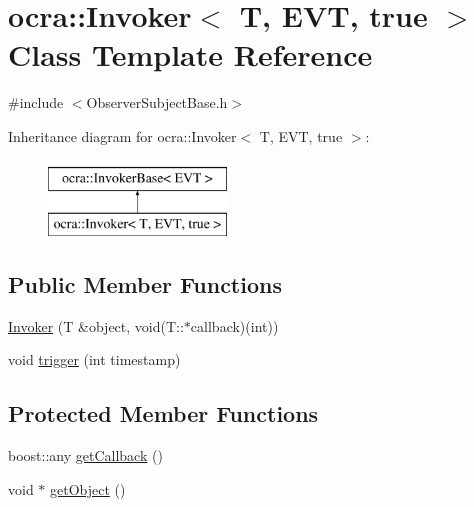 \hypertarget{classocra_1_1Invoker_3_01T_00_01EVT_00_01true_01_4}{}\section{ocra\+:\+:Invoker$<$ T, E\+VT, true $>$ Class Template Reference}
\label{classocra_1_1Invoker_3_01T_00_01EVT_00_01true_01_4}


{\ttfamily \#include $<$Observer\+Subject\+Base.\+h$>$}

Inheritance diagram for ocra\+:\+:Invoker$<$ T, E\+VT, true $>$\+:\begin{figure}[H]
\begin{center}
\leavevmode
\includegraphics[height=2.000000cm]{d5/d80/classocra_1_1Invoker_3_01T_00_01EVT_00_01true_01_4}
\end{center}
\end{figure}
\subsection*{Public Member Functions}
\begin{DoxyCompactItemize}
\item 
\hyperlink{classocra_1_1Invoker_3_01T_00_01EVT_00_01true_01_4_afba0606d59375568cb88fe02023c962e}{Invoker} (T \&object, void(T\+::$\ast$callback)(int))
\item 
void \hyperlink{classocra_1_1Invoker_3_01T_00_01EVT_00_01true_01_4_a9b6283c07e6477a21c4b82b17940d832}{trigger} (int timestamp)
\end{DoxyCompactItemize}
\subsection*{Protected Member Functions}
\begin{DoxyCompactItemize}
\item 
boost\+::any \hyperlink{classocra_1_1Invoker_3_01T_00_01EVT_00_01true_01_4_a902cb0e1084dc60929920a56631c8586}{get\+Callback} ()
\item 
void $\ast$ \hyperlink{classocra_1_1Invoker_3_01T_00_01EVT_00_01true_01_4_ab187a80065f38c9a650e0a5b35185153}{get\+Object} ()
\end{DoxyCompactItemize}
